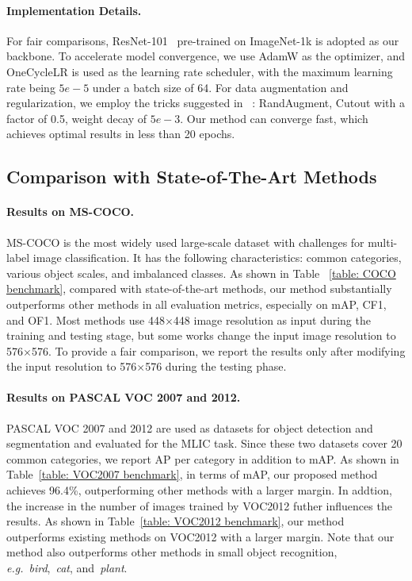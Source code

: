 \documentclass{ecai}
\def\eg{{\em e.g.}}
\begin{document}
\paragraph{Implementation Details.}
For fair comparisons, ResNet-101~\cite{He2016CVPR} pre-trained on ImageNet-1k is adopted as our backbone. 
To accelerate model convergence, we use AdamW as the optimizer, and OneCycleLR is used as the learning rate scheduler, with the maximum learning rate being $5e\!\!-\!\!5$ under a batch size of 64.
For data augmentation and regularization, we employ the tricks suggested in ~\cite{liu2021q2l}: RandAugment, Cutout with a factor of 0.5, weight decay of $5e\!-\!3$.
Our method can converge fast, which achieves optimal results in less than 20 epochs.
\subsection{Comparison with State-of-The-Art Methods}
\paragraph{Results on MS-COCO.}
MS-COCO is the most widely used large-scale dataset with challenges for multi-label image classification. It has the following characteristics: common categories, various object scales, and imbalanced classes.
As shown in Table ~\ref{table: COCO benchmark}, compared with state-of-the-art methods, our method substantially outperforms other methods in all evaluation metrics, especially on mAP, CF1, and OF1.
Most methods use 448$\times$448 image resolution as input during the training and testing stage, but some works change the input image resolution to 576$\times$576.
To provide a fair comparison, we report the results only after modifying the input resolution to 576$\times$576 during the testing phase.


\paragraph{Results on PASCAL VOC 2007 and 2012.}
PASCAL VOC 2007 and 2012 are used as datasets for object detection and segmentation and evaluated for the MLIC task.
Since these two datasets cover 20 common categories, we report AP per category in addition to mAP.
As shown in Table~\ref{table: VOC2007 benchmark}, in terms of mAP, our proposed method achieves 96.4\%, outperforming other methods with a larger margin.
In addtion, the increase in the number of images trained by VOC2012 futher influences the results. 
As shown in Table~\ref{table: VOC2012 benchmark}, our method outperforms existing methods on VOC2012 with a larger margin.
Note that our method also outperforms other methods in small object recognition, \eg{}~\textit{bird},~\textit{cat}, and~\textit{plant}.
\end{document}
